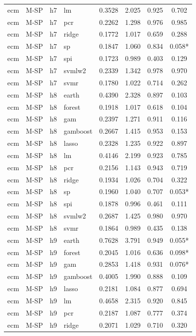 \begin{ThreePartTable}
\begin{longtable}[t]{llclcccc}
ecm & M-SP & h7 & lm & 0.3528 & 2.025 & 0.925 & 0.702\\
ecm & M-SP & h7 & pcr & 0.2262 & 1.298 & 0.976 & 0.985\\
ecm & M-SP & h7 & ridge & 0.1772 & 1.017 & 0.659 & 0.288\\
ecm & M-SP & h7 & sp & 0.1847 & 1.060 & 0.834 & 0.058*\\
ecm & M-SP & h7 & spi & 0.1723 & 0.989 & 0.403 & 0.129\\
ecm & M-SP & h7 & svmlw2 & 0.2339 & 1.342 & 0.978 & 0.970\\
ecm & M-SP & h7 & svmr & 0.1780 & 1.022 & 0.714 & 0.262\\
\addlinespace
ecm & M-SP & h8 & earth & 0.4390 & 2.328 & 0.897 & 0.103\\
ecm & M-SP & h8 & forest & 0.1918 & 1.017 & 0.618 & 0.104\\
ecm & M-SP & h8 & gam & 0.2397 & 1.271 & 0.911 & 0.116\\
ecm & M-SP & h8 & gamboost & 0.2667 & 1.415 & 0.953 & 0.153\\
ecm & M-SP & h8 & lasso & 0.2328 & 1.235 & 0.922 & 0.897\\
ecm & M-SP & h8 & lm & 0.4146 & 2.199 & 0.923 & 0.785\\
ecm & M-SP & h8 & pcr & 0.2156 & 1.143 & 0.943 & 0.719\\
ecm & M-SP & h8 & ridge & 0.1934 & 1.026 & 0.704 & 0.322\\
ecm & M-SP & h8 & sp & 0.1960 & 1.040 & 0.707 & 0.053*\\
ecm & M-SP & h8 & spi & 0.1878 & 0.996 & 0.461 & 0.111\\
ecm & M-SP & h8 & svmlw2 & 0.2687 & 1.425 & 0.980 & 0.970\\
ecm & M-SP & h8 & svmr & 0.1864 & 0.989 & 0.435 & 0.138\\
\addlinespace
ecm & M-SP & h9 & earth & 0.7628 & 3.791 & 0.949 & 0.055*\\
ecm & M-SP & h9 & forest & 0.2045 & 1.016 & 0.636 & 0.098*\\
ecm & M-SP & h9 & gam & 0.2853 & 1.418 & 0.931 & 0.076*\\
ecm & M-SP & h9 & gamboost & 0.4005 & 1.990 & 0.888 & 0.109\\
ecm & M-SP & h9 & lasso & 0.2181 & 1.084 & 0.877 & 0.694\\
ecm & M-SP & h9 & lm & 0.4658 & 2.315 & 0.920 & 0.845\\
ecm & M-SP & h9 & pcr & 0.2187 & 1.087 & 0.777 & 0.374\\
ecm & M-SP & h9 & ridge & 0.2071 & 1.029 & 0.710 & 0.320\\

\end{longtable}
\end{ThreePartTable}
